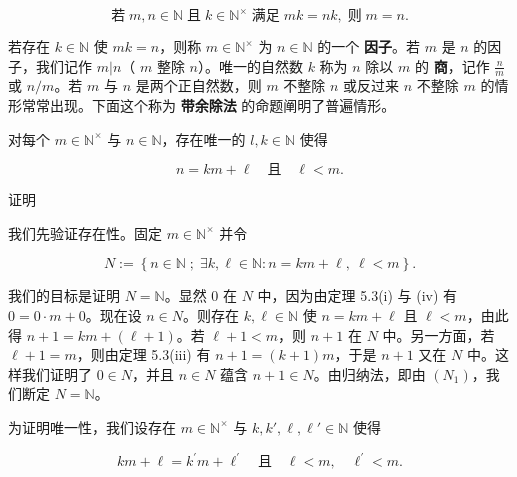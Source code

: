 \begin{equation}
\mathrm{若}\;m,n\in\mathbb{N}\;\mathrm{且}\;k\in\mathbb{N}^{\times}\;\mathrm{满足}\;m k=n k,\;\mathrm{则}\;m=n.
\end{equation}

若存在 $ k \in \mathbb{N} $ 使 $ mk = n $，则称 $ m \in \mathbb{N}^\times $ 为 $ n \in \mathbb{N} $ 的一个 \textbf{因子}。若 $ m $ 是 $ n $ 的因子，我们记作 $ m|n $（ $ m $ 整除 $ n $）。唯一的自然数 $ k $ 称为 $ n $ 除以 $ m $ 的 \textbf{商}，记作 $ \frac{n}{m} $ 或 $ n/m $。若 $ m $ 与 $ n $ 是两个正自然数，则 $ m $ 不整除 $ n $ 或反过来 $ n $ 不整除 $ m $ 的情形常常出现。下面这个称为 \textbf{带余除法} 的命题阐明了普遍情形。

\begin{proposition}

对每个 $ m \in \mathbb{N}^\times $ 与 $ n \in \mathbb{N} $，存在唯一的 $ l, k \in \mathbb{N} $ 使得

\[
n=km+\ell\quad\text{且}\quad\ell<m.
\]

证明

\begin{items}
\item

我们先验证存在性。固定 $ m \in \mathbb{N}^\times $ 并令

\[
N:=\left\{n\in\mathbb{N}\;;\;\exists k,\ell\in\mathbb{N}\colon n=km+\ell,\ \ell<m\right\}.
\]

\begin{subitems}
\item

我们的目标是证明 $N = \mathbb{N}$。显然 0 在 $N$ 中，因为由定理 5.3(i) 与 (iv) 有 $0 = 0 \cdot m + 0$。现在设 $n \in N$。则存在 $k, \ell \in \mathbb{N}$ 使 $n = km + \ell$ 且 $\ell < m$，由此得 $n + 1 = km + (\ell + 1)$。若 $\ell + 1 < m$，则 $n + 1$ 在 $N$ 中。另一方面，若 $\ell + 1 = m$，则由定理 5.3(iii) 有 $n + 1 = (k + 1)m$，于是 $n + 1$ 又在 $N$ 中。这样我们证明了 $0 \in N$，并且 $n \in N$ 蕴含 $n + 1 \in N$。由归纳法，即由 $(N_1)$，我们断定 $N = \mathbb{N}$。

\end{subitems}

\item

为证明唯一性，我们设存在 $ m \in \mathbb{N}^\times $ 与 $ k, k', \ell, \ell' \in \mathbb{N} $ 使得

\begin{equation}
k m+\ell=k^{\prime}m+\ell^{\prime}\quad\text{且}\quad\ell<m,\quad\ell^{\prime}<m.
\end{equation}


\end{items}
\end{proposition}
